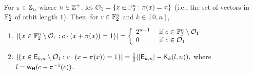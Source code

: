 \documentclass{llncs}
\begin{document}
\begin{proposition}\label{prop:x+pix}
For $\pi \in \mathbb{S}_n$ where  $n \in \mathbb{Z}^+$, let $\mathcal{O}_1 = \{x \in \mathbb{F}_2^n : \pi(x) = x\}$ (i.e.,  the set of vectors in $\mathbb{F}_2^n$ of orbit length $1$). Then, for $c \in \mathbb{F}_2^n$ and $k \in [0,n]$,
\begin{enumerate}
\item \label{itm:f2n} $|\{x \in \mathbb{F}_2^n \setminus \mathcal{O}_1 : c \cdot (x + \pi(x))= 1\}| 
= \left \{ \begin{array}{ll}
2^{n-1}  &  \text{ if } c \in \mathbb{F}_2^n \setminus \mathcal{O}_1  \\
0              &  \text{ if } c \in \mathcal{O}_1.
\end{array} \right.$
\item \label{itm:ekn} $\left| \{x \in \mathsf{E}_{k,n} \setminus \mathcal{O}_1 : c \cdot (x + \pi(x))= 1\} \right| 
= \frac{1}{2} (|\mathsf{E}_{k,n}| - \mathsf{K}_{k}(l,n)),$
where $l = \mathsf{w_H}(c+\pi^{-1}(c))$.
\end{enumerate}
\end{proposition}
\end{document}
